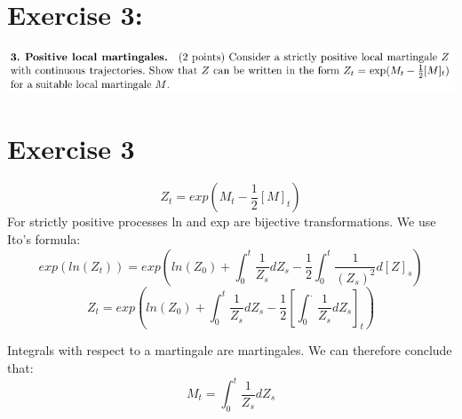 \documentclass[document.tex]{subfiles}
\begin{document}
\section*{Exercise 3:}

\includegraphics[width=\textwidth]{ex3.png}

\section{Exercise 3}
\begin{equation}
Z_t = exp(M_t - \frac{1}{2} [M]_t)
\end{equation}
For strictly positive processes ln and exp are bijective transformations. We use Ito's formula:
\begin{equation}
exp(ln(Z_t)) = exp(ln(Z_0) + \int_0^t \frac{1}{Z_s} d Z_s - \frac{1}{2} \int_0^t \frac{1}{(Z_s)^2} d[Z]_s)
\end{equation}
\begin{equation}
Z_t = exp(ln(Z_0) + \int_0^t \frac{1}{Z_s} d Z_s - \frac{1}{2} [\int_0^. \frac{1}{Z_s} d Z_s]_t)
\end{equation}

Integrals with respect to a martingale are martingales. We can therefore conclude that:
\begin{equation}
M_t = \int_0^t \frac{1}{Z_s} d Z_s
\end{equation}



\end{document}
